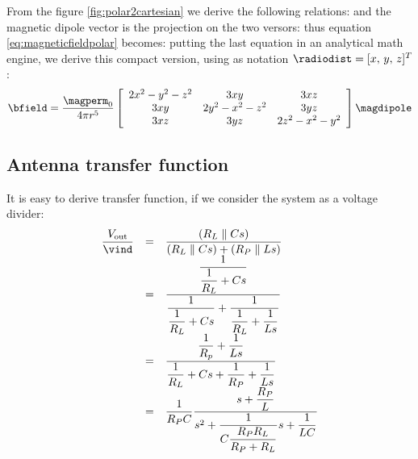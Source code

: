 From the figure \ref{fig:polar2cartesian} we derive the following relations:
and the magnetic dipole vector is the projection on the two versors:
thus equation \ref{eq:magneticfieldpolar} becomes:
putting the last equation in an analytical math engine, we derive this compact version, using as notation $\radiodist = [x,\,y,\,z]^T$:
\begin{equation}
\bfield = \dfrac{\magperm_0}{4 \pi r^5} \magfieldmatrix \magdipole
\end{equation}

\subsection{Antenna transfer function}
It is easy to derive transfer function, if we consider the system as a voltage divider:
\begin{equation}\label{eq:transferfunc}
\begin{array}{ccl}
\dfrac{V_{\mathrm{out}}}{\vind} & = & \dfrac{\left(R_L \parallel C s \right)}{\left(R_L \parallel C s \right) + \left(R_P \parallel L s \right)} \\
& = & \dfrac{\dfrac{1}{\dfrac{1}{R_L} + Cs}}{\dfrac{1}{\dfrac{1}{R_L} + Cs} + \dfrac{1}{\dfrac{1}{R_L} + \dfrac{1}{L s}}} \\
& = & \dfrac{ \dfrac{1}{R_p}+\dfrac{1}{Ls} }{ \dfrac{1}{R_L} + Cs + \dfrac{1}{R_P} + \dfrac{1}{Ls} } \\
& = & \dfrac{1}{R_P C} \dfrac{s + \dfrac{R_P}{L}}{s^2 + \dfrac{1}{C \dfrac{R_P R_L}{R_P + R_L}}s + \dfrac{1}{LC}} 
\end{array}
\end{equation}